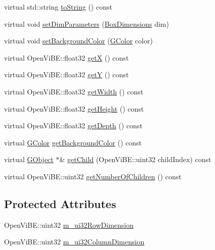 \begin{DoxyCompactItemize}
\item 
virtual std::string \hyperlink{classOpenViBEApplications_1_1GTable_aa622d2eec95a252e6f50dff7e62907f3}{toString} () const 
\item 
virtual void \hyperlink{classOpenViBEApplications_1_1GTable_a6069509b3c789fb805cb5fba97d088ae}{setDimParameters} (\hyperlink{structOpenViBEApplications_1_1__BoxDimensions}{BoxDimensions} dim)
\item 
virtual void \hyperlink{classOpenViBEApplications_1_1GTable_ad070ba6f22ec04ee7368d336685540c5}{setBackgroundColor} (\hyperlink{structOpenViBEApplications_1_1GColor}{GColor} color)
\item 
virtual OpenViBE::float32 \hyperlink{classOpenViBEApplications_1_1GTable_a3296e0de57d02543c6e8ec5dd83f0fdb}{getX} () const 
\item 
virtual OpenViBE::float32 \hyperlink{classOpenViBEApplications_1_1GTable_ac760d57bf59776f43b4aa9d9ef67b842}{getY} () const 
\item 
virtual OpenViBE::float32 \hyperlink{classOpenViBEApplications_1_1GTable_a0053c9b37252b65e716b5e0459f67635}{getWidth} () const 
\item 
virtual OpenViBE::float32 \hyperlink{classOpenViBEApplications_1_1GTable_a5d636e49cf4b9d4be9a7e56e80ae4a3c}{getHeight} () const 
\item 
virtual OpenViBE::float32 \hyperlink{classOpenViBEApplications_1_1GTable_ad3c0aafd05933bedae7250ba3cfa26a2}{getDepth} () const 
\item 
virtual \hyperlink{structOpenViBEApplications_1_1GColor}{GColor} \hyperlink{classOpenViBEApplications_1_1GTable_a8ac401539646d8b6fc67b795936fcc95}{getBackgroundColor} () const 
\item 
virtual \hyperlink{classOpenViBEApplications_1_1GObject}{GObject} $\ast$\& \hyperlink{classOpenViBEApplications_1_1GTable_a83ee8656dff840136a327ef14f8fd4ec}{getChild} (OpenViBE::uint32 childIndex) const 
\item 
virtual OpenViBE::uint32 \hyperlink{classOpenViBEApplications_1_1GTable_a3f57a3b10b03b67112dafd7d20267867}{getNumberOfChildren} () const 
\end{DoxyCompactItemize}
\subsection*{Protected Attributes}
\begin{DoxyCompactItemize}
\item 
OpenViBE::uint32 \hyperlink{classOpenViBEApplications_1_1GTable_ad81d25d3ed3c3f51622ab76849fd30fa}{m\_\-ui32RowDimension}
\item 
OpenViBE::uint32 \hyperlink{classOpenViBEApplications_1_1GTable_aec1ba9d4316dcbf2558c07774f9f10dc}{m\_\-ui32ColumnDimension}
\end{DoxyCompactItemize}


